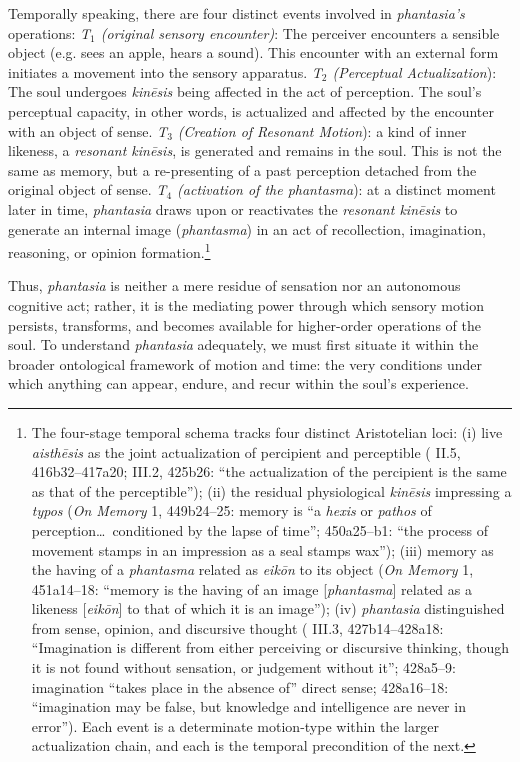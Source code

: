 \documentclass{article}
\begin{document}
Temporally speaking, there are four distinct events involved in \textit{phantasia's} operations: \textit{T$_1$ (original sensory encounter)}: The perceiver encounters a sensible object (e.g. sees an apple, hears a sound). This encounter with an external form initiates a movement into the sensory apparatus. \textit{T$_2$ (Perceptual Actualization}): The soul undergoes \textit{kinēsis} being affected in the act of perception. The soul's perceptual capacity, in other words, is actualized and affected by the encounter with an object of sense. \textit{T$_3$ (Creation of Resonant Motion}): a kind of inner likeness, a \textit{resonant kinēsis}, is generated and remains in the soul. This is not the same as memory, but a re-presenting of a past perception detached from the original object of sense. \textit{T$_4$ (activation of the phantasma}): at a distinct moment later in time, \textit{phantasia} draws upon or reactivates the \textit{resonant kinēsis} to generate an internal image (\textit{phantasma}) in an act of recollection, imagination, reasoning, or opinion formation.\footnote{The four-stage temporal schema tracks four distinct Aristotelian loci: (i) live \textit{aisth\=esis} as the joint actualization of percipient and perceptible (\cite{aristotle2014soul} II.5, 416b32--417a20; III.2, 425b26: ``the actualization of the percipient is the same as that of the perceptible''); (ii) the residual physiological \textit{kin\=esis} impressing a \textit{typos} (\textit{On Memory} 1, 449b24--25: memory is ``a \textit{hexis} or \textit{pathos} of perception\ldots\ conditioned by the lapse of time''; 450a25--b1: ``the process of movement stamps in an impression as a seal stamps wax''); (iii) memory as the having of a \textit{phantasma} related as \textit{eik\=on} to its object (\textit{On Memory} 1, 451a14--18: ``memory is the having of an image [\textit{phantasma}] related as a likeness [\textit{eik\=on}] to that of which it is an image''); (iv) \textit{phantasia} distinguished from sense, opinion, and discursive thought (\cite{aristotle2014soul} III.3, 427b14--428a18: ``Imagination is different from either perceiving or discursive thinking, though it is not found without sensation, or judgement without it''; 428a5--9: imagination ``takes place in the absence of'' direct sense; 428a16--18: ``imagination may be false, but knowledge and intelligence are never in error''). Each event is a determinate motion-type within the larger actualization chain, and each is the temporal precondition of the next.} 

Thus, \textit{phantasia} is neither a mere residue of sensation nor an autonomous cognitive act; rather, it is the mediating power through which sensory motion persists, transforms, and becomes available for higher-order operations of the soul. To understand \textit{phantasia} adequately, we must first situate it within the broader ontological framework of motion and time: the very conditions under which anything can appear, endure, and recur within the soul's experience. 
\end{document}
